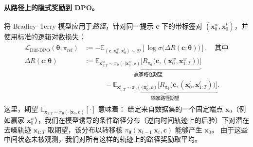 \paragraph{从路径上的隐式奖励到 DPO。}
将 Bradley--Terry 模型应用于\emph{路径}，针对同一提示 $\mathbf c$ 下的带标签对 $(\mathbf x^w_0,\mathbf x^l_0)$，并使用标准的逻辑对数损失：
\begin{align}\label{eq:diffusion-dpo}
\begin{aligned}
\mathcal L_{\mathrm{Diff\text{-}DPO}}(\bm\theta;\pi_{\mathrm{ref}})
&:=
- \mathbb E_{(\mathbf c,\mathbf x_0^w,\mathbf x_0^l)\sim\mathcal D}
 \left[\log \sigma \big(\Delta R(\mathbf c;\bm\theta)\big)\right], \quad \text{其中}\\
\Delta R(\mathbf c;\bm\theta)
&:=
\underbrace{\mathbb E_{\mathbf x_{1:T}^w\sim \pi_{\bm\theta}(\cdot | \mathbf x_0^w,\mathbf c)}
 \Big[R_{\pi_{\bm\theta}} \big(\mathbf c,(\mathbf x_0^w,\mathbf x_{1:T}^w)\big)\Big]}_{\text{赢家路径期望}}
\\ &\quad\quad\quad-
\underbrace{\mathbb E_{\mathbf x_{1:T}^l\sim \pi_{\bm\theta}(\cdot | \mathbf x_0^l,\mathbf c)}
 \Big[R_{\pi_{\bm\theta}} \big(\mathbf c,(\mathbf x_0^l,\mathbf x_{1:T}^l)\big)\Big]}_{\text{输家路径期望}}.
\end{aligned}
\end{align}
这里，期望 $\mathbb E_{\mathbf x_{1:T}\sim\pi_{\bm\theta}(\cdot|\mathbf x_0,\mathbf c)}[\cdot]$ 意味着：
给定来自数据集的一个固定端点 $\mathbf x_0$（例如赢家 $\mathbf x_0^w$），我们在模型诱导的条件路径分布（逆向时间轨迹上的后验）下对潜在去噪轨迹 $\mathbf x_{1:T}$ 取期望，该分布以转移核
$\pi_{\bm\theta}(\mathbf x_{t-1}|\mathbf x_t,\mathbf c)$ 能够产生 $\mathbf x_0$。
由于这些中间状态未被观测，我们对所有这样的轨迹上的路径奖励取平均。


